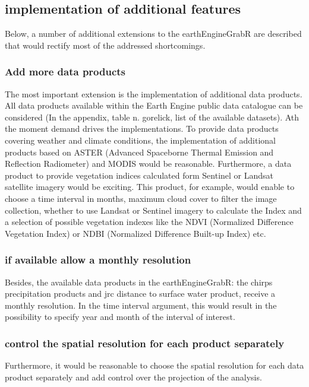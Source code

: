 \subsection{implementation of additional features}

Below, a number of additional extensions to the earthEngineGrabR are described that would rectify most of the addressed shortcomings.

\subsubsection{Add more data products}

The most important extension is the implementation of additional data products. All data products available within the Earth Engine public data catalogue can be considered (In the appendix, table n. gorelick, list of the available datasets). Ath the moment demand drives the implementations. To provide data products covering weather and climate conditions, the implementation of additional products based on ASTER (Advanced Spaceborne Thermal Emission and Reflection Radiometer) and MODIS would be reasonable. Furthermore, a data product to provide vegetation indices calculated form Sentinel or Landsat satellite imagery would be exciting. This product, for example, would enable to choose a time interval in months, maximum cloud cover to filter the image collection, whether to use Landsat or Sentinel imagery to calculate the Index and a selection of possible vegetation indexes like the NDVI (Normalized Difference Vegetation Index) or NDBI (Normalized Difference Built-up Index) etc. 

\subsubsection{if available allow a monthly resolution}

Besides, the available data products in the earthEngineGrabR: the chirps precipitation products and jrc distance to surface water product, receive a monthly resolution. In the time interval argument, this would result in the possibility to specify year and month of the interval of interest.

\subsubsection{control the spatial resolution for each product separately}

Furthermore, it would be reasonable to choose the spatial resolution for each data product separately and add control over the projection of the analysis. 

